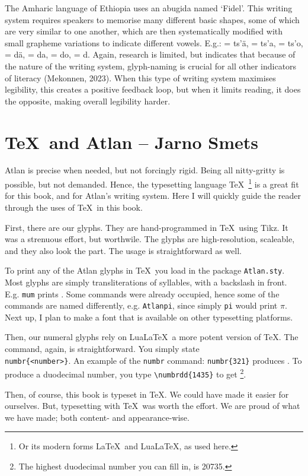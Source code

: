 The Amharic language of Ethiopia uses an abugida named ‘Fidel’. This writing system requires speakers to memorise many different basic shapes, some of which are very similar to one another, which are then systematically modified with small grapheme variations to indicate different vowels. E.g.:  = ts’\"{a},  = ts’a,  = ts’o,  = d\"{a},  = da,  = do,  = d. Again, research is limited, but indicates that because of the nature of the writing system, glyph-naming is crucial for all other indicators of literacy (Mekonnen, 2023). When this type of writing system maximises legibility, this creates a positive feedback loop, but when it limits reading, it does the opposite, making overall legibility harder.  

\section{\TeX\ and Atlan -- {\small Jarno Smets}}
Atlan is precise when needed, but not forcingly rigid. Being all nitty-gritty is possible, but not demanded. Hence, the typesetting language \TeX\ \footnote{Or its modern forms \LaTeX\ and Lua\LaTeX, as used here.} is a great fit for this book, and for Atlan's writing system. Here I will quickly guide the reader through the uses of \TeX\ in this book.

First, there are our glyphs. They are hand-programmed in \TeX\ using Tikz. It was a strenuous effort, but worthwile. The glyphs are high-resolution, scaleable, and they also look the part. The usage is straightforward as well. 

To print any of the Atlan glyphs in \TeX\, you load in the package {\tt Atlan.sty}. Most glyphs are simply transliterations of syllables, with a backslash in front. E.g. \texttt{mum} prints \mum. Some commands were already occupied, hence some of the commands are named differently, e.g. \texttt{Atlanpi}, since simply \texttt{pi} would print $\pi$. Next up, I plan to make a font that is available on other typesetting platforms. 

Then, our numeral glyphs rely on Lua\LaTeX\, a more potent version of \TeX. The command, again, is straightforward. You simply state \texttt{\\numbr\{<number>\footnotemark\}}.   An example of the {\tt numbr} command: \texttt{numbr\{321\}} produces . To produce a duodecimal number, you type \verb|\numbrdd{1435}| to get \footnote{The highest duodecimal number you can fill in, is 20735.}. 



Then, of course, this book is typeset in \TeX . We could have made it easier for ourselves. But, typesetting with \TeX\ was worth the effort. We are proud of what we have made; both content- and appearance-wise.    


\vfill
